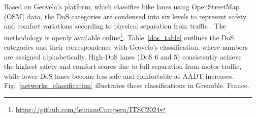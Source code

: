 \documentclass[letterpaper, 10 pt, conference]{ieeeconf}  %
\begin{document}
Based on Geovelo's platform, which classifies bike lanes using OpenStreetMap (OSM) data, the DoS categories are condensed into six levels to represent safety and comfort variations according to physical separation from traffic \cite{2024graphbased}. The methodology is openly available online\footnote{\url{https://github.com/leunamCampero/ITSC2024}}. Table~\ref{dos_table} outlines the DoS categories and their correspondence with Geovelo’s classification, where numbers are assigned alphabetically. High-DoS lanes (DoS 6 and 5) consistently achieve the highest safety and comfort scores due to full separation from motor traffic, while lower-DoS lanes become less safe and comfortable as AADT increases. Fig.~\ref{networks_classification} illustrates these classifications in Grenoble, France.






\end{document}
